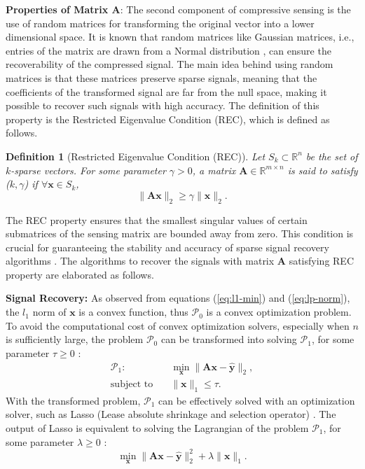 \documentclass[conference, 10pt]{IEEEtran}
\newtheorem{definition}{Definition}
\begin{document}
\textbf{Properties of Matrix $\mathbf{A}$}: The second component of compressive sensing is the use of random matrices for transforming the original vector into a lower dimensional space. It is known that random matrices like Gaussian matrices, i.e., entries of the matrix are drawn from a Normal distribution \cite{foucart2013invitation}, can ensure the recoverability of the compressed signal. The main idea behind using random matrices is that these matrices preserve sparse signals, meaning that the coefficients of the transformed signal are far from the null space, making it possible to recover such signals with high accuracy. The definition of this property is the Restricted Eigenvalue Condition (REC), which is defined as follows.

\begin{definition}[Restricted Eigenvalue Condition (REC)]
\label{eq:rec}
Let $S_k \subset \mathbb{R}^n$ be the set of $k$-sparse vectors. For some parameter $\gamma > 0$, a matrix $\mathbf{A} \in \mathbb{R}^{m \times n}$ is said to satisfy ($k, \gamma$) if $\forall \mathbf{x} \in S_k$,
\begin{equation*}
\|\mathbf{Ax}\|_2 \geq \gamma \|\mathbf{x}\|_2. 
\end{equation*}
\end{definition}

The REC property ensures that the smallest singular values of certain submatrices of the sensing matrix are bounded away from zero. This condition is crucial for guaranteeing the stability and accuracy of sparse signal recovery algorithms \cite{raskutti2010restricted}. The algorithms to recover the signals with matrix $\mathbf{A}$ satisfying REC property are elaborated as follows.

\textbf{Signal Recovery:}
As observed from equations (\ref{eq:l1-min}) and (\ref{eq:lp-norm}), the $l_1$ norm of $\mathbf{x}$ is a convex function, thus $\mathcal{P}_0$ is a convex optimization problem. To avoid the computational cost of convex optimization solvers, especially when $n$ is sufficiently large, the problem $\mathcal{P}_0$ can be transformed into solving $\mathcal{P}_1$, for some parameter $\tau \geq 0$ \cite{foucart2013invitation}:
\begin{equation}
\label{eq:transformed-l2-min}
\begin{split}
\mathcal{P}_1: & \quad \min_{\mathbf{x}} \|\mathbf{Ax - \hat{y}}\|_2, \\
\text{subject to} & \quad \|\mathbf{x}\|_1 \leq \tau.
\end{split}
\end{equation}
With the transformed problem, $\mathcal{P}_1$ can be effectively solved with an optimization solver, such as Lasso (Lease absolute shrinkage and selection operator) \cite{foucart2013invitation, bora2017compressed}. The output of Lasso is equivalent to solving the Lagrangian of the problem $\mathcal{P}_1$, for some parameter $\lambda \geq 0$ \cite[Equation 3.1]{foucart2013invitation}:
\begin{equation}
\min_{\mathbf{x}} \|\mathbf{Ax - \hat{y}}\|_2^2 + \lambda \|\mathbf{x}\|_1.
\label{eq:lasso-lagrangian}
\end{equation}
\end{document}
